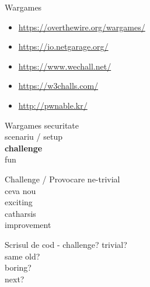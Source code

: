 \documentclass{simple}
\begin{document}
\begin{frame}{Wargames}
  \begin{itemize}
    \item \url{https://overthewire.org/wargames/}
    \item \url{https://io.netgarage.org/}
    \item \url{https://www.wechall.net/}
    \item \url{https://w3challs.com/}
    \item \url{http://pwnable.kr/}
  \end{itemize}
\end{frame}

\begin{frame}{Wargames}
  \centering
  \pause
  \vspace{0.5cm}
  \Large{securitate} \\
  \pause
  \vspace{0.5cm}
  \Large{scenariu / setup} \\
  \pause
  \vspace{0.5cm}
  \Large{\textbf{challenge}} \\
  \pause
  \vspace{0.5cm}
  \Large{fun}
\end{frame}

\begin{frame}{Challenge / Provocare}
  \centering
  \pause
  \vspace{0.5cm}
  \Large{ne-trivial} \\
  \pause
  \vspace{0.5cm}
  \Large{ceva nou} \\
  \pause
  \vspace{0.5cm}
  \Large{exciting} \\
  \pause
  \vspace{0.5cm}
  \Large{catharsis} \\
  \pause
  \vspace{0.5cm}
  \Large{improvement}
\end{frame}

\begin{frame}{Scrisul de cod - challenge?}
  \centering
  \pause
  \vspace{0.5cm}
  \Large{trivial?} \\
  \pause
  \vspace{0.5cm}
  \Large{same old?} \\
  \pause
  \vspace{0.5cm}
  \Large{boring?} \\
  \pause
  \vspace{0.5cm}
  \Large{next?}
\end{frame}
\end{document}
